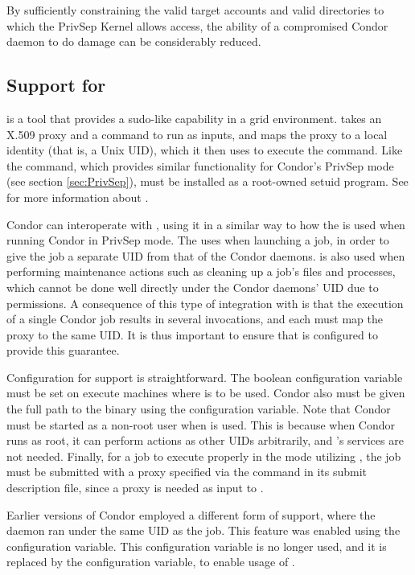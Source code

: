 By sufficiently constraining the valid target
accounts and valid directories to which the PrivSep Kernel allows
access, the ability of a compromised Condor daemon to do damage can
be considerably reduced.

\subsection{\label{sec:glexec}Support for }

 is a tool that provides a sudo-like capability in a grid
environment. 
 takes an X.509 proxy and a command to run as
inputs,
and maps the proxy to a local identity (that is, a Unix UID),
which it then uses to execute the command.
Like the  command,
which provides similar functionality for Condor's PrivSep mode
(see section \ref{sec:PrivSep}),  must be installed as a root-owned
setuid program. See 
for more information about .

Condor can interoperate with , using it in a similar way
to how the  is used when running Condor in
PrivSep mode. The  uses  when launching
a job, in order to give the job a separate UID from that of the Condor daemons.
 is also used when performing maintenance actions such as
cleaning up a job's files and processes, which cannot be done well
directly under the Condor daemons' UID due to permissions.
A consequence
of this type of integration with  is that the execution
of a single Condor job results in several  invocations, and
each must map the proxy to the same UID.
It is thus important to ensure
that  is configured to provide this guarantee.

Configuration for  support is straightforward. 
The boolean configuration variable  
must be set  on execute machines where  is to be used.
Condor also must be given the full path
to the  binary using the  configuration variable.
Note that Condor must be started as a non-root user when  is used.
This is because when Condor runs as root,
it can perform actions as other UIDs arbitrarily,
and 's services are not needed.
Finally, for a job to execute
properly in the mode utilizing ,
the job must be submitted with a proxy
specified via the  command in
its submit description file,
since a proxy is needed as input to .

Earlier versions of Condor employed a different form of 
support, where the  daemon ran under the same UID as the job.
This feature was enabled using 
the  configuration variable.
This configuration variable is no longer used,
and it is replaced by the  configuration variable,
to enable usage of .

